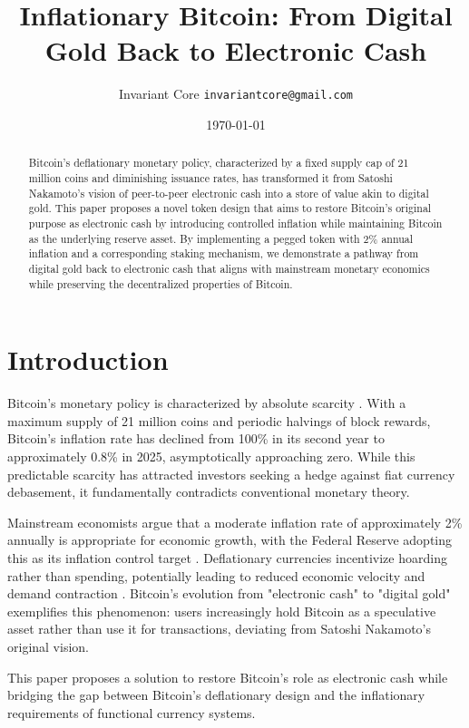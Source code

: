 \documentclass[11pt]{article}
\title{Inflationary Bitcoin: From Digital Gold Back to Electronic Cash}
\author{Invariant Core \texttt{invariantcore@gmail.com}}
\date{\today}
\begin{document}
\maketitle

\begin{abstract}
Bitcoin's deflationary monetary policy, characterized by a fixed supply cap of 21 million coins and diminishing issuance rates, has transformed it from Satoshi Nakamoto's vision of peer-to-peer electronic cash into a store of value akin to digital gold. This paper proposes a novel token design that aims to restore Bitcoin's original purpose as electronic cash by introducing controlled inflation while maintaining Bitcoin as the underlying reserve asset. By implementing a pegged token with 2\% annual inflation and a corresponding staking mechanism, we demonstrate a pathway from digital gold back to electronic cash that aligns with mainstream monetary economics while preserving the decentralized properties of Bitcoin.
\end{abstract}

\section{Introduction}

Bitcoin's monetary policy is characterized by absolute scarcity \cite{nakamoto2008}. With a maximum supply of 21 million coins and periodic halvings of block rewards, Bitcoin's inflation rate has declined from 100\% in its second year to approximately 0.8\% in 2025, asymptotically approaching zero. While this predictable scarcity has attracted investors seeking a hedge against fiat currency debasement, it fundamentally contradicts conventional monetary theory.

Mainstream economists argue that a moderate inflation rate of approximately 2\% annually is appropriate for economic growth, with the Federal Reserve adopting this as its inflation control target \cite{fomc2012statement}. Deflationary currencies incentivize hoarding rather than spending, potentially leading to reduced economic velocity and demand contraction \cite{krugman1998}. Bitcoin's evolution from "electronic cash" to "digital gold" exemplifies this phenomenon: users increasingly hold Bitcoin as a speculative asset rather than use it for transactions, deviating from Satoshi Nakamoto's original vision.

This paper proposes a solution to restore Bitcoin's role as electronic cash while bridging the gap between Bitcoin's deflationary design and the inflationary requirements of functional currency systems.
\end{document}
